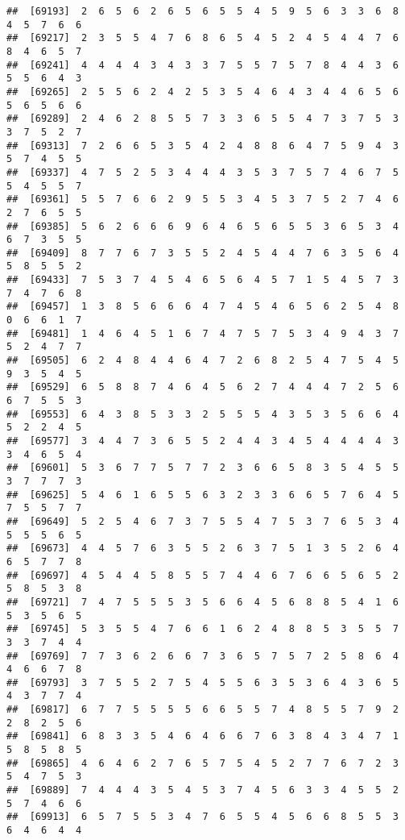 \documentclass[
]{book}
\begin{document}
\begin{verbatim}
##  [69193]  2  6  5  6  2  6  5  6  5  5  4  5  9  5  6  3  3  6  8  4  5  7  6  6
##  [69217]  2  3  5  5  4  7  6  8  6  5  4  5  2  4  5  4  4  7  6  8  4  6  5  7
##  [69241]  4  4  4  4  3  4  3  3  7  5  5  7  5  7  8  4  4  3  6  5  5  6  4  3
##  [69265]  2  5  5  6  2  4  2  5  3  5  4  6  4  3  4  4  6  5  6  5  6  5  6  6
##  [69289]  2  4  6  2  8  5  5  7  3  3  6  5  5  4  7  3  7  5  3  3  7  5  2  7
##  [69313]  7  2  6  6  5  3  5  4  2  4  8  8  6  4  7  5  9  4  3  5  7  4  5  5
##  [69337]  4  7  5  2  5  3  4  4  4  3  5  3  7  5  7  4  6  7  5  5  4  5  5  7
##  [69361]  5  5  7  6  6  2  9  5  5  3  4  5  3  7  5  2  7  4  6  2  7  6  5  5
##  [69385]  5  6  2  6  6  6  9  6  4  6  5  6  5  5  3  6  5  3  4  6  7  3  5  5
##  [69409]  8  7  7  6  7  3  5  5  2  4  5  4  4  7  6  3  5  6  4  5  8  5  5  2
##  [69433]  7  5  3  7  4  5  4  6  5  6  4  5  7  1  5  4  5  7  3  7  4  7  6  8
##  [69457]  1  3  8  5  6  6  6  4  7  4  5  4  6  5  6  2  5  4  8  0  6  6  1  7
##  [69481]  1  4  6  4  5  1  6  7  4  7  5  7  5  3  4  9  4  3  7  5  2  4  7  7
##  [69505]  6  2  4  8  4  4  6  4  7  2  6  8  2  5  4  7  5  4  5  9  3  5  4  5
##  [69529]  6  5  8  8  7  4  6  4  5  6  2  7  4  4  4  7  2  5  6  6  7  5  5  3
##  [69553]  6  4  3  8  5  3  3  2  5  5  5  4  3  5  3  5  6  6  4  5  2  2  4  5
##  [69577]  3  4  4  7  3  6  5  5  2  4  4  3  4  5  4  4  4  4  3  3  4  6  5  4
##  [69601]  5  3  6  7  7  5  7  7  2  3  6  6  5  8  3  5  4  5  5  3  7  7  7  3
##  [69625]  5  4  6  1  6  5  5  6  3  2  3  3  6  6  5  7  6  4  5  7  5  5  7  7
##  [69649]  5  2  5  4  6  7  3  7  5  5  4  7  5  3  7  6  5  3  4  5  5  5  6  5
##  [69673]  4  4  5  7  6  3  5  5  2  6  3  7  5  1  3  5  2  6  4  6  5  7  7  8
##  [69697]  4  5  4  4  5  8  5  5  7  4  4  6  7  6  6  5  6  5  2  5  8  5  3  8
##  [69721]  7  4  7  5  5  5  3  5  6  6  4  5  6  8  8  5  4  1  6  5  3  5  6  5
##  [69745]  5  3  5  5  4  7  6  6  1  6  2  4  8  8  5  3  5  5  7  3  3  7  4  4
##  [69769]  7  7  3  6  2  6  6  7  3  6  5  7  5  7  2  5  8  6  4  4  6  6  7  8
##  [69793]  3  7  5  5  2  7  5  4  5  5  6  3  5  3  6  4  3  6  5  4  3  7  7  4
##  [69817]  6  7  7  5  5  5  5  6  6  5  5  7  4  8  5  5  7  9  2  2  8  2  5  6
##  [69841]  6  8  3  3  5  4  6  4  6  6  7  6  3  8  4  3  4  7  1  5  8  5  8  5
##  [69865]  4  6  4  6  2  7  6  5  7  5  4  5  2  7  7  6  7  2  3  5  4  7  5  3
##  [69889]  7  4  4  4  3  5  4  5  3  7  4  5  6  3  3  4  5  5  2  5  7  4  6  6
##  [69913]  6  5  7  5  5  3  4  7  6  5  5  4  5  6  6  8  5  5  3  6  4  6  4  4

\end{verbatim}
\end{document}
